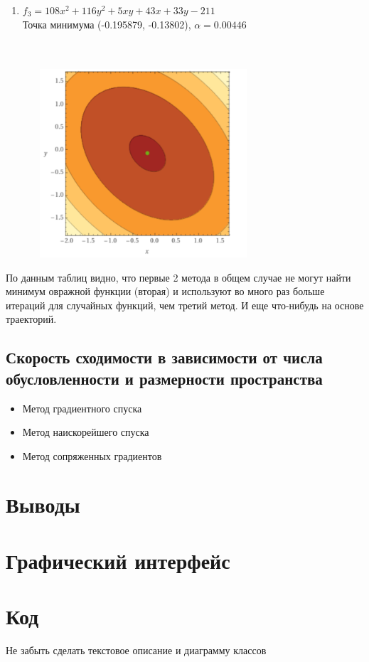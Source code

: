 \begin{enumerate}
	\item \(f_3 = 108x^2 + 116y^2 + 5xy + 43x + 33y - 211\) \\
	      Точка минимума (-0.195879, -0.13802), $\alpha = 0.00446$  \\
	      \\
	       \\
	      \begin{center}
		      \includegraphics[width=9cm, height=7cm]{img/f3.png}
	      \end{center}

\end{enumerate}

По данным таблиц видно, что первые 2 метода в общем случае не могут найти минимум овражной функции (вторая) и используют во много раз больше итераций для случайных функций, чем третий метод.
И еще что-нибудь на основе траекторий.

\subsection{Скорость сходимости в зависимости от числа обусловленности и размерности пространства}

\begin{itemize}
	\item Метод градиентного спуска

	\item Метод наискорейшего спуска

	\item Метод сопряженных градиентов
\end{itemize}

\section{Выводы}

\section{Графический интерфейс}

\section{Код}
Не забыть сделать текстовое описание и диаграмму классов



